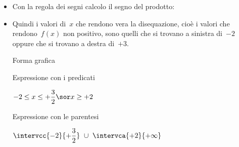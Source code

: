 \begin{esempio}
\begin{itemize}
 \item 
 \vspace{-1em} 
 Con la regola dei segni calcolo il segno del prodotto:
 \vspace{-1em}

\begin{inaccessibleblock}
  \begin{center}
  \segnoprodottoa
  \end{center}
\end{inaccessibleblock}

 \item 
 \vspace{-1em}
 Quindi i valori di~\(x\) che rendono vera la disequazione, cioè i 
valori che rendono~\(f(x)\) non positivo, sono quelli 
che si trovano a sinistra di~\(-2\) oppure che si trovano a destra 
di~\(+3\).\\

  \begin{minipage}{.32\textwidth}
  Forma grafica\\[-1.2em]
  
\begin{inaccessibleblock}
  \begin{center}
  \solprodottoa
  \end{center}
\end{inaccessibleblock}
\vspace{.1em}

  \end{minipage}
  \begin{minipage}{.32\textwidth}
  Espressione con i predicati\\[-.3em]
  
 \begin{center}
  \(-2 \le x \le +\dfrac{3}{2} \sor x \ge +2\)
  \vspace{1em}
 \end{center}
  \end{minipage}
  \begin{minipage}{.32\textwidth}
  Espressione con le parentesi\\[-.3em]
  
 \begin{center}
  \(\intervcc{-2}{+\dfrac{3}{2}}~\cup~\intervca{+2}{+\infty}\)
  \vspace{.8em}
 \end{center}
  \end{minipage}
  
\end{itemize}

\end{esempio}

